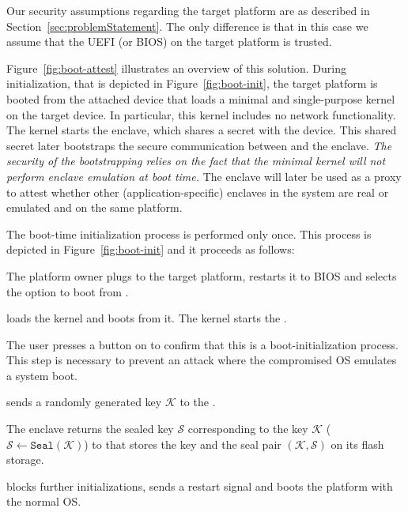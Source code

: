 Our security assumptions regarding the target platform are as described in Section~\ref{sec:problemStatement}. The only difference is that in this case we assume that the UEFI (or BIOS) on the target platform is trusted.


Figure~\ref{fig:boot-attest} illustrates an overview of this solution. During initialization, that is depicted in Figure~\ref{fig:boot-init}, the target platform is booted from the attached device that loads a minimal and single-purpose \name kernel on the target device. In particular, this kernel includes no network functionality. The kernel starts the \name enclave, which shares a secret with the device. This shared secret later bootstraps the secure communication between \device and the \name enclave. \emph{The security of the bootstrapping relies on the fact that the minimal kernel will not perform enclave emulation at boot time.} The \name enclave will later be used as a proxy to attest whether other (application-specific) enclaves in the system are real or emulated and on the same platform.


 The boot-time initialization process is performed only once.
This process is depicted in Figure~\ref{fig:boot-init} and it proceeds as follows:



\begin{mylist}
  \item[\one] The platform owner plugs \device to the target platform, restarts it to BIOS and selects the option to boot from \device.
  \item[\two] \device loads the \name kernel and boots from it. The \name kernel starts the \nameclave.
  \item[\three] The user presses a button on \device to confirm that this is a boot-initialization process. This step is necessary to prevent an attack where the compromised OS emulates a system boot.
  \item[\four] \device sends a randomly generated key $\mathcal{K}$ to the \nameclave.
  \item[\five] The enclave returns the sealed key $\mathcal{S}$ corresponding to the key $\mathcal{K}$ ($\mathcal{S}\leftarrow\texttt{Seal}(\mathcal{K})$) to \device that stores the key and the seal pair $(\mathcal{K}, \mathcal{S})$ on its flash storage.
  \item[\six] \device blocks further initializations, sends a restart signal and boots the platform with the normal OS.
\end{mylist}


